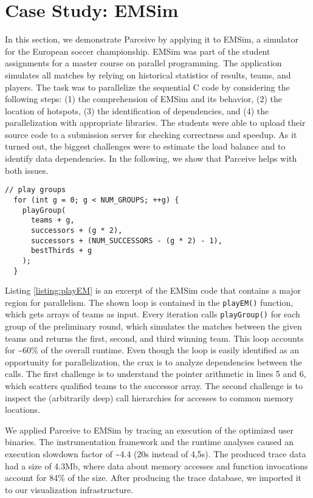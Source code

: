 \section{Case Study: EMSim}
\label{sec:case_study}
In this section, we demonstrate Parceive by applying it to EMSim, a simulator
for the European soccer championship. EMSim was part of the student assignments
for a master course on parallel programming. The application simulates all
matches by relying on historical statistics of results, teams, and players. The
task was to parallelize the sequential C code by considering the following
steps: (1) the comprehension of EMSim and its behavior, (2) the location of
hotspots, (3) the identification of dependencies, and (4) the parallelization
with appropriate libraries. The students were able to upload their source code
to a submission server for checking correctness and speedup. As it turned out,
the biggest challenges were to estimate the load balance and to identify data
dependencies. In the following, we show that Parceive helps with both issues.

\begin{lstlisting}[caption=A major region for loop-parallelism in the
EMSim code, label=listing:playEM]
  // play groups
  for (int g = 0; g < NUM_GROUPS; ++g) {
    playGroup(
      teams + g,
      successors + (g * 2),
      successors + (NUM_SUCCESSORS - (g * 2) - 1),
      bestThirds + g
    );
  }
\end{lstlisting}

Listing \ref{listing:playEM} is an excerpt of the EMSim code that contains a
major region for parallelism. The shown loop is contained in the
\texttt{playEM()} function, which gets arrays of teams as input. Every
iteration calls \texttt{playGroup()} for each group of the preliminary round,
which simulates the matches between the given teams and returns the first,
second, and third winning team. This loop accounts for \textasciitilde60\% of
the overall runtime. Even though the loop is easily identified as an
opportunity for parallelization, the crux is to analyze dependencies between
the calls. The first challenge is to understand the pointer arithmetic in lines
5 and 6, which scatters qualified teams to the successor array. The second
challenge is to inspect the (arbitrarily deep) call hierarchies for accesses to
common memory locations.

We applied Parceive to EMSim by tracing an execution of the optimized user
binaries. The instrumentation framework and the runtime analyses caused an
execution slowdown factor of \textasciitilde 4.4 (20s instead of 4,5s). The
produced trace data had a size of 4.3Mb, where data about memory accesses and
function invocations account for 84\% of the size. After producing the trace
database, we imported it to our visualization infrastructure.

